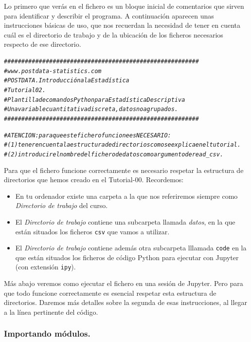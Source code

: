 \documentclass[10pt,a4paper]{article}\usepackage[]{graphicx}\usepackage[]{color}
\makeatletter
\newcommand{\hlcom}[1]{\textcolor[rgb]{0.678,0.584,0.686}{\textit{#1}}}%
\newenvironment{kframe}{%
 \def\at@end@of@kframe{}%
 \ifinner\ifhmode%
  \def\at@end@of@kframe{\end{minipage}}%
  \begin{minipage}{\columnwidth}%
 \fi\fi%
 \def\FrameCommand##1{\hskip\@totalleftmargin \hskip-\fboxsep
 \colorbox{shadecolor}{##1}\hskip-\fboxsep
     \hskip-\linewidth \hskip-\@totalleftmargin \hskip\columnwidth}%
 \MakeFramed {\advance\hsize-\width
   \@totalleftmargin\z@ \linewidth\hsize
   \@setminipage}}%
 {\par\unskip\endMakeFramed%
 \at@end@of@kframe}
\newenvironment{knitrout}{}{} %
\newcounter {cont01}
\makeatother
\begin{document}
Lo primero que verás en el fichero es un bloque inicial de comentarios que sirven para identificar y describir el programa. A continuación aparecen unas instrucciones básicas de uso, que nos recuerdan la necesidad de tener en cuenta cuál es el directorio de trabajo y de la ubicación de los ficheros necesarios respecto de ese directorio.
\begin{knitrout}
\color{fgcolor}\begin{kframe}
\begin{alltt}
\hlcom{########################################################}
\hlcom{# www.postdata-statistics.com}
\hlcom{# POSTDATA. Introducción a la Estadística}
\hlcom{# Tutorial 02.  }
\hlcom{# Plantilla de comandos Python para Estadística Descriptiva}
\hlcom{# Una variable cuantitativa discreta, datos no agrupados.}
\hlcom{########################################################}


\hlcom{# ATENCION: para que este fichero funcione es NECESARIO: }
\hlcom{# (1) tener en cuenta la estructura de directorios como se explica en el tutorial. }
\hlcom{# (2) introducir el nombre del fichero de datos como argumento de read_csv.}
\end{alltt}
\end{kframe}
\end{knitrout}
Para que el fichero funcione correctamente es necesario respetar la estructura de directorios que hemos creado en el Tutorial-00. Recordemos:
\begin{itemize}
\item En tu ordenador existe una carpeta a la que nos referiremos siempre como {\em Directorio de trabajo} del curso.
\item El {\em Directorio de trabajo} contiene una subcarpeta llamada {\em datos}, en la que están situados los ficheros {\tt csv} que vamos a utilizar.
\item El {\em Directorio de trabajo} contiene además otra subcarpeta lllamada {\tt code} en la que están situados los ficheros de código Python para ejecutar con Jupyter (con extensión {\tt ipy}).
\end{itemize}
Más abajo veremos como ejecutar el fichero en una sesión de Jupyter. Pero para que todo funcione correctamente es esencial respetar esta estructura de directorios. Daremos más detalles sobre la segunda de esas instrucciones, al llegar a la línea pertinente del código.

\subsubsection*{Importando módulos.}
\label{tut02:subsubsec:importandoModulos}
\end{document}
